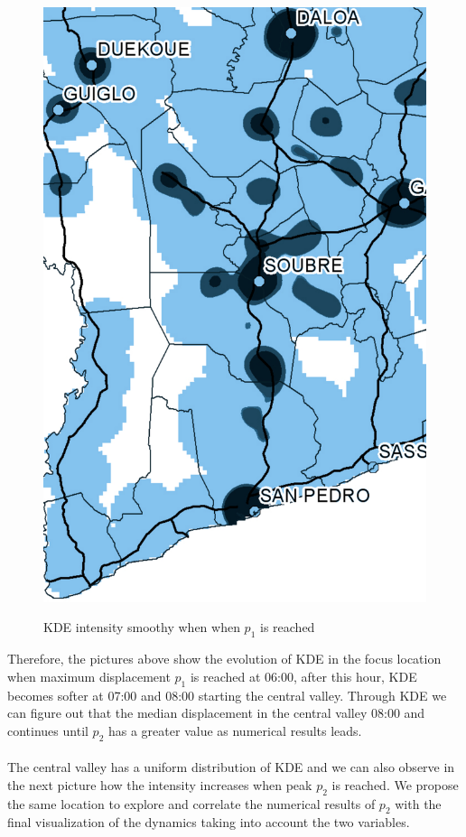 \begin{figure}[h!]
{    \includegraphics[scale = 0.1]{results/images/kernel/l_hour8_kd_detail.pdf}
	\label{fig:subfig2_detail}
}
\caption[KDE intensity dynamic when $p_1$ is reached and central valley starts]{KDE intensity smoothy when when  $p_1$ is reached}
\label{fig:subfigureExample}
\end{figure}


Therefore, the pictures above show the evolution of KDE in the focus location when maximum displacement $p_1$ is reached at 06:00, after this hour, KDE becomes softer at 07:00 and 08:00 starting the central valley. Through KDE  we can figure out that the median displacement in the central valley 08:00 and continues until $p_2$ has a greater value as numerical results leads.
\\
\\
The central valley has a uniform distribution of KDE and we can also observe in the next picture how the intensity increases when peak $p_2$ is reached. We propose the same location to explore and correlate the numerical results of $p_2$ with the final visualization of the dynamics taking into account the two variables.



